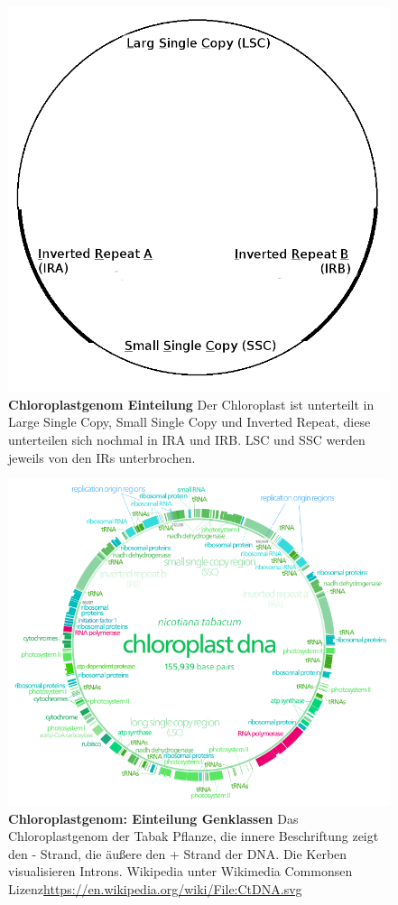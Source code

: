 \documentclass{scrartcl}
\begin{document}
\begin{figure}
\includegraphics[width=.9\linewidth]{./Chloroplast_1.png}
\caption[Chloroplastgenom Einteilung]{\textbf{Chloroplastgenom Einteilung} Der Chloroplast ist unterteilt in Large Single Copy, Small Single Copy und Inverted Repeat, diese unterteilen sich nochmal in IRA und IRB. LSC und SSC werden jeweils von den IRs unterbrochen.}
\end{figure}

\begin{figure}
\includegraphics[width=.9\linewidth]{./703px-CtDNA.png}
\caption[Chloroplastgenom: Genklassen]{\textbf{Chloroplastgenom: Einteilung Genklassen} Das Chloroplastgenom der Tabak Pflanze, die innere Beschriftung zeigt den - Strand, die äußere den + Strand der DNA. Die Kerben visualisieren Introns.   Wikipedia unter Wikimedia Commonsen Lizenz\url{https://en.wikipedia.org/wiki/File:CtDNA.svg}}
\end{figure}
\end{document}
